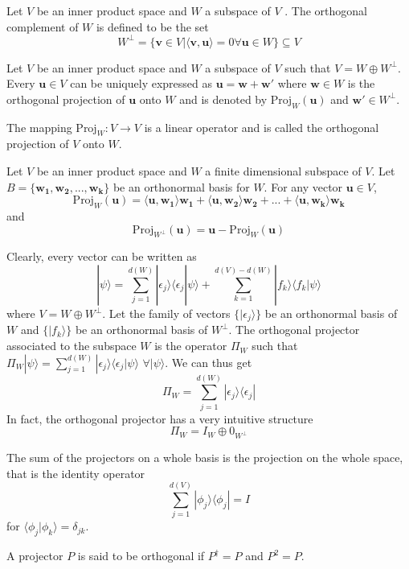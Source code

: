 \documentclass[a4paper]{article}
\begin{document}
\begin{defi}
Let $V$ be an inner product space and $W$ a subspace of $V$ . The orthogonal complement of $W$ is defined to be the set
$$W^{\perp}=\{\mathbf{v}\in V|\langle\mathbf{v},\mathbf{u}\rangle=0 \forall\mathbf{u}\in W\}\subseteq V$$
\end{defi}
\begin{defi}
Let $V$ be an inner product space and $W$ a subspace of $V$ such that $V = W\oplus W^{\perp}$. Every $\mathbf{u}\in V$ can be uniquely expressed as $\mathbf{u}=\mathbf{w}+\mathbf{w'}$ where $\mathbf{w}\in W$ is the orthogonal projection of $\mathbf{u}$ onto $W$ and is denoted by $\text{Proj}_{W}(\mathbf{u})$ and $\mathbf{w'}\in W^{\perp}$.
\end{defi}
\begin{cor}
The mapping $\text{Proj}_{W}:V\rightarrow V$ is a linear operator and is called the orthogonal projection of $V$ onto $W$.
\end{cor}
\begin{thm}
Let $V$ be an inner product space and $W$ a finite dimensional subspace of $V$. Let $B=\{\mathbf{w_1},\mathbf{w_2},...,\mathbf{w_k}\}$ be an orthonormal basis for $W$. For any vector $\mathbf{u}\in V$,
$$\text{Proj}_W(\mathbf{u})=\langle\mathbf{u},\mathbf{w_1}\rangle\mathbf{w_1}+\langle\mathbf{u},\mathbf{w_2}\rangle\mathbf{w_2}+...+\langle\mathbf{u},\mathbf{w_k}\rangle\mathbf{w_k}$$
and 
$$\text{Proj}_{W^{\perp}}(\mathbf{u})=\mathbf{u}-\text{Proj}_W(\mathbf{u})$$
\end{thm}
\begin{eg}
Clearly, every vector can be written as
$$|\psi\rangle=\sum_{j=1}^{d(W)}|\epsilon_j\rangle\langle\epsilon_j|\psi\rangle+\sum_{k=1}^{d(V)-d(W)}|f_k\rangle\langle f_k|\psi\rangle$$
where $V=W\oplus W^{\perp}$. Let the family of vectors $\{|\epsilon_j\rangle\}$ be an orthonormal basis of $W$ and $\{|f_k\rangle\}$ be an orthonormal basis of $W^\perp$. The orthogonal projector associated to the subspace $W$ is the operator $\Pi_W$ such that $\Pi_W|\psi\rangle=\sum_{j=1}^{d(W)}|\epsilon_j\rangle\langle\epsilon_j|\psi\rangle$ $\forall |\psi\rangle$. We can thus get
$$\Pi_W=\sum_{j=1}^{d(W)}|\epsilon_j\rangle\langle\epsilon_j|$$
In fact, the orthogonal projector has a very intuitive structure
$$\Pi_W=I_W\oplus 0_{W^\perp}$$
\end{eg}
\begin{thm}
The sum of the projectors on a whole basis is the projection on the whole space, that is the identity operator
$$\sum_{j=1}^{d(V)}|\phi_j\rangle\langle\phi_j|=I$$
for $\langle\phi_j|\phi_k\rangle=\delta_{jk}$.
\end{thm}
\begin{defi}
A projector $P$ is said to be orthogonal if $P^\dag=P$ and $P^2=P$.
\end{defi}
\end{document}
